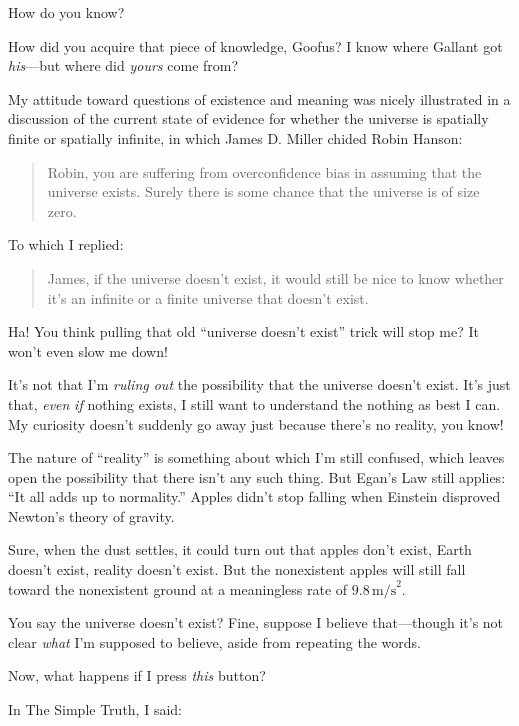 {
 How do you know?}

{
 How did you acquire that piece of knowledge, Goofus? I know where
Gallant got \textit{his}{}---but where did \textit{yours} come from?}

{
 My attitude toward questions of existence and meaning was nicely
illustrated in a discussion of the current state of evidence for
whether the universe is spatially finite or spatially infinite, in
which James D. Miller chided Robin Hanson:}

\begin{quote}
{
 Robin, you are suffering from overconfidence bias in assuming that
the universe exists. Surely there is some chance that the universe is
of size zero.}
\end{quote}

{
 To which I replied:}

\begin{quote}
{
 James, if the universe doesn't exist, it would
still be nice to know whether it's an infinite or a
finite universe that doesn't exist.}
\end{quote}

{
 Ha! You think pulling that old ``universe
doesn't exist'' trick will stop me?
It won't even slow me down!}

{
 It's not that I'm \textit{ruling
out} the possibility that the universe doesn't exist.
It's just that, \textit{even} \textit{if} nothing
exists, I still want to understand the nothing as best I can. My
curiosity doesn't suddenly go away just because
there's no reality, you know!}

{
 The nature of ``reality'' is
something about which I'm still confused, which leaves
open the possibility that there isn't any such thing.
But Egan's Law still applies: ``It all
adds up to normality.'' Apples didn't
stop falling when Einstein disproved Newton's theory of
gravity.}

{
 Sure, when the dust settles, it could turn out that apples
don't exist, Earth doesn't exist,
reality doesn't exist. But the nonexistent apples will
still fall toward the nonexistent ground at a meaningless rate of $9.8 \,
\mathrm{m/s}^{2}$.}

{
 You say the universe doesn't exist? Fine, suppose
I believe that---though it's not clear \textit{what}
I'm supposed to believe, aside from repeating the
words.}

{
 Now, what happens if I press \textit{this} button?}

{
 In The Simple Truth, I said:}

